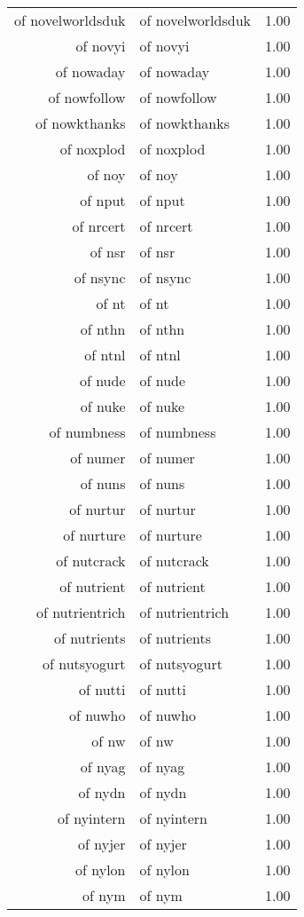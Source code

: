 \begin{table}[ht]
\begin{tabular}{rlr}
  of novelworldsduk & of novelworldsduk & 1.00 \\ 
  of novyi & of novyi & 1.00 \\ 
  of nowaday & of nowaday & 1.00 \\ 
  of nowfollow & of nowfollow & 1.00 \\ 
  of nowkthanks & of nowkthanks & 1.00 \\ 
  of noxplod & of noxplod & 1.00 \\ 
  of noy & of noy & 1.00 \\ 
  of nput & of nput & 1.00 \\ 
  of nrcert & of nrcert & 1.00 \\ 
  of nsr & of nsr & 1.00 \\ 
  of nsync & of nsync & 1.00 \\ 
  of nt & of nt & 1.00 \\ 
  of nthn & of nthn & 1.00 \\ 
  of ntnl & of ntnl & 1.00 \\ 
  of nude & of nude & 1.00 \\ 
  of nuke & of nuke & 1.00 \\ 
  of numbness & of numbness & 1.00 \\ 
  of numer & of numer & 1.00 \\ 
  of nuns & of nuns & 1.00 \\ 
  of nurtur & of nurtur & 1.00 \\ 
  of nurture & of nurture & 1.00 \\ 
  of nutcrack & of nutcrack & 1.00 \\ 
  of nutrient & of nutrient & 1.00 \\ 
  of nutrientrich & of nutrientrich & 1.00 \\ 
  of nutrients & of nutrients & 1.00 \\ 
  of nutsyogurt & of nutsyogurt & 1.00 \\ 
  of nutti & of nutti & 1.00 \\ 
  of nuwho & of nuwho & 1.00 \\ 
  of nw & of nw & 1.00 \\ 
  of nyag & of nyag & 1.00 \\ 
  of nydn & of nydn & 1.00 \\ 
  of nyintern & of nyintern & 1.00 \\ 
  of nyjer & of nyjer & 1.00 \\ 
  of nylon & of nylon & 1.00 \\ 
  of nym & of nym & 1.00 \\ 

\end{tabular}
\end{table}
